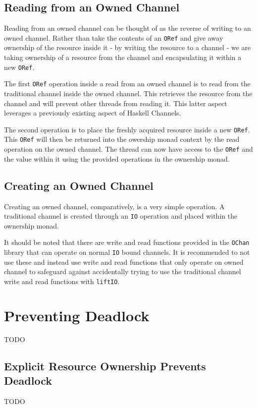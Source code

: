 \documentclass[onehalf,11pt]{beavtex}
\begin{document}
\subsection{Reading from an Owned Channel}

Reading from an owned channel can be thought of as the reverse of
writing to an owned channel.  Rather than take the contents of an
\texttt{ORef} and give away ownership of the resource inside it - by writing the
resource to a channel - we are taking ownership of a resource from the channel
and encapsulating it within a new \texttt{ORef}.

The first \texttt{ORef} operation inside a read from an owned channel
is to read from the traditional channel inside the owned channel. This
retrieves the resource from the channel and will prevent other threads from
reading it. This latter aspect leverages a previously existing aspect of
Haskell Channels. %

The second operation is to place the freshly acquired resource inside a new
\texttt{ORef}.  This \texttt{ORef} will then be returned into the
owership monad context by the read operation on the
owned channel.  The thread can now have access to the \texttt{ORef}
and the value within it using the provided operations in the
ownership monad.


\subsection{Creating an Owned Channel}

Creating an owned channel, comparatively, is a very simple operation.
A traditional channel is created through an \texttt{IO} operation and placed
within the ownership monad.

It should be noted that there are write and read functions provided
in the \texttt{OChan} library that can operate on normal \texttt{IO} bound
channels.  It is recommended to not use these and instead use write and read
functions that only operate on owned channel to safeguard against
accidentally trying to use the traditional channel write and read functions
with \texttt{liftIO}.

\section{Preventing Deadlock}
TODO

\subsection{Explicit Resource Ownership Prevents Deadlock}
TODO
\end{document}
